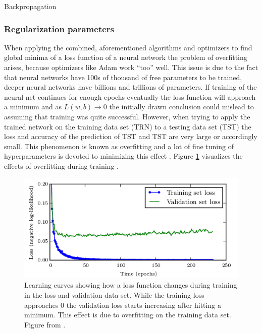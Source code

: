 Backpropagation \cite{rumelhart1988learning}

\subsubsection{Regularization parameters}

When applying the combined, aforementioned algorithms and optimizers to find global minima of a loss function
of a neural network the problem of overfitting arises, because optimizers like Adam work ``too'' well. This
issue is due to the fact that neural networks have 100s of thousand of free parameters to be trained, deeper
neural networks have billions and trillions of parameters. If training of the neural net continues for enough
epochs eventually the loss function will approach a minimum and as $ L(w,b)\rightarrow 0 $ the initially drawn
conclusion could mislead to assuming that training was quite successful. However, when trying to apply the
trained network on the training data set (TRN) to a testing data set (TST) the loss and accuracy of the
prediction of TST and TST are very large or accordingly small. This phenomenon is known as overfitting and a
lot of fine tuning of hyperparameters is devoted to minimizing this effect \cite{tetko1995neural}. Figure
\ref{fig:overfitting} visualizes the effects of overfitting during training \cite{goodfellow2016deep}.

\begin{figure}[H]
  \centering \includegraphics[height=.35\textheight, width=1.1\textwidth]{Figures/overfitting} \decoRule
  \caption[Training vs. validation loss over time]{Learning curves showing how a loss function changes during training
   in the loss and validation data set. While the training loss approaches 0 the validation loss starts increasing
   after hitting a minimum. This effect is due to overfitting on the training data set. Figure from
   \cite{goodfellow2016deep}.}
 \label{fig:overfitting}
\end{figure}

